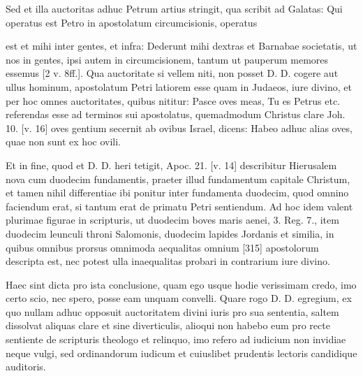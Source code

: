 Sed et illa auctoritas adhuc Petrum artius stringit, qua scribit ad Galatas: Qui operatus est Petro in apostolatum circumcisionis, operatus

est et mihi inter gentes, et infra: Dederunt mihi dextras et Barnabae societatis, ut nos in gentes, ipsi autem in circumcisionem, tantum ut pauperum memores essemus [2 v. 8ff.]. Qua auctoritate si vellem niti, non posset D. D. cogere aut ullus hominum, apostolatum Petri latiorem esse quam in Judaeos, iure divino, et per hoc omnes auctoritates, quibus nititur: Pasce oves meas, Tu es Petrus etc. referendas esse ad terminos sui apostolatus, quemadmodum Christus clare Joh. 10. [v. 16] oves gentium secernit ab ovibus Israel, dicens: Habeo adhuc alias oves, quae non sunt ex hoc ovili.

Et in fine, quod et D. D. heri tetigit, Apoc. 21. [v. 14] describitur Hierusalem nova cum duodecim fundamentis, praeter illud fundamentum capitale Christum, et tamen nihil differentiae ibi ponitur inter fundamenta duodecim, quod omnino faciendum erat, si tantum erat de primatu Petri sentiendum. Ad hoc idem valent plurimae figurae in scripturis, ut duodecim boves maris aenei, 3. Reg. 7., item duodecim leunculi throni Salomonis, duodecim lapides Jordanis et similia, in quibus omnibus prorsus omnimoda aequalitas omnium [315] apostolorum descripta est, nec potest ulla inaequalitas probari in contrarium iure divino.

Haec sint dicta pro ista conclusione, quam ego usque hodie verissimam credo, imo certo scio, nec spero, posse eam unquam convelli. Quare rogo D. D. egregium, ex quo nullam adhuc opposuit auctoritatem divini iuris pro sua sententia, saltem dissolvat aliquas clare et sine diverticulis, alioqui non habebo eum pro recte sentiente de scripturis theologo et relinquo, imo refero ad iudicium non invidiae neque vulgi, sed ordinandorum iudicum et cuiuslibet prudentis lectoris candidique auditoris.

